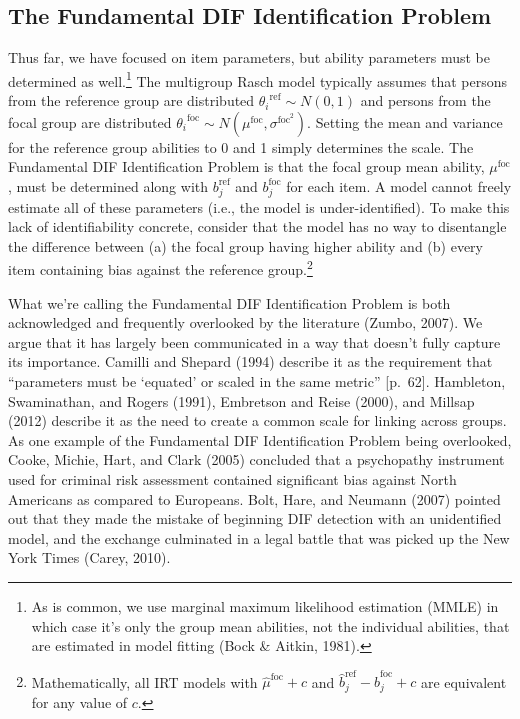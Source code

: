 \documentclass[
  english,
  man,floatsintext]{apa6}
\begin{document}
\hypertarget{the-fundamental-dif-identification-problem}{%
\subsection{The Fundamental DIF Identification Problem}\label{the-fundamental-dif-identification-problem}}

Thus far, we have focused on item parameters, but ability parameters must be determined as well.\footnote{As is common, we use marginal maximum likelihood estimation (MMLE) in which case it's only the group mean abilities, not the individual abilities, that are estimated in model fitting (Bock \& Aitkin, 1981).} The multigroup Rasch model typically assumes that persons from the reference group are distributed \({\theta_i}^{\text{ref}} \sim N(0,1)\) and persons from the focal group are distributed \({\theta_i}^{\text{foc}} \sim N(\mu^{\text{foc}}, \sigma^{\text{foc}^2})\). Setting the mean and variance for the reference group abilities to 0 and 1 simply determines the scale. The Fundamental DIF Identification Problem is that the focal group mean ability, \(\mu^{\text{foc}}\), must be determined along with \(b_j^{\text{ref}}\) and \(b_j^{\text{foc}}\) for each item. A model cannot freely estimate all of these parameters (i.e., the model is under-identified). To make this lack of identifiability concrete, consider that the model has no way to disentangle the difference between (a) the focal group having higher ability and (b) every item containing bias against the reference group.\footnote{Mathematically, all IRT models with \(\hat\mu^{\text{foc}} + c\) and \(\hat b_j^{\text{ref}} - \hat b_j^{\text{foc}} + c\) are equivalent for any value of \(c\).}

What we're calling the Fundamental DIF Identification Problem is both acknowledged and frequently overlooked by the literature (Zumbo, 2007). We argue that it has largely been communicated in a way that doesn't fully capture its importance. Camilli and Shepard (1994) describe it as the requirement that ``parameters must be `equated' or scaled in the same metric'' {[}p.~62{]}. Hambleton, Swaminathan, and Rogers (1991), Embretson and Reise (2000), and Millsap (2012) describe it as the need to create a common scale for linking across groups. As one example of the Fundamental DIF Identification Problem being overlooked, Cooke, Michie, Hart, and Clark (2005) concluded that a psychopathy instrument used for criminal risk assessment contained significant bias against North Americans as compared to Europeans. Bolt, Hare, and Neumann (2007) pointed out that they made the mistake of beginning DIF detection with an unidentified model, and the exchange culminated in a legal battle that was picked up the New York Times (Carey, 2010).
\end{document}
